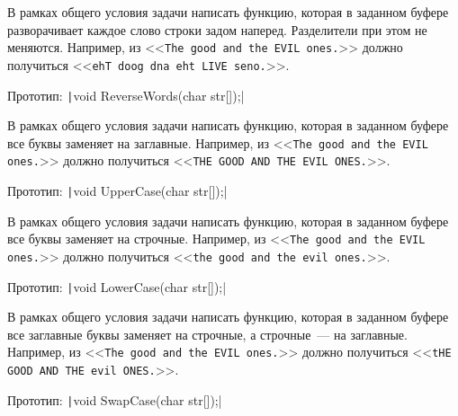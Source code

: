 
\begin{zztask}
В рамках общего условия задачи написать функцию, которая в заданном буфере
разворачивает каждое слово строки задом наперед. Разделители при этом не
меняются.
Например, из
<<\texttt{The good and the EVIL ones.}>>
должно получиться
<<\texttt{ehT doog dna eht LIVE seno.}>>.

Прототип: \texttt|void ReverseWords(char str[]);|
\end{zztask}


\begin{zztask}
В рамках общего условия задачи написать функцию, которая в заданном буфере
все буквы заменяет на заглавные.
Например, из
<<\texttt{The good and the EVIL ones.}>>
должно получиться
<<\texttt{THE GOOD AND THE EVIL ONES.}>>.

Прототип: \texttt|void UpperCase(char str[]);|
\end{zztask}


\begin{zztask}
В рамках общего условия задачи написать функцию, которая в заданном буфере
все буквы заменяет на строчные.
Например, из
<<\texttt{The good and the EVIL ones.}>>
должно получиться
<<\texttt{the good and the evil ones.}>>.

Прототип: \texttt|void LowerCase(char str[]);|
\end{zztask}


\begin{zztask}
В рамках общего условия задачи написать функцию, которая в заданном буфере
все заглавные буквы заменяет на строчные, а строчные~--- на заглавные.
Например, из
<<\texttt{The good and the EVIL ones.}>>
должно получиться
<<\texttt{tHE GOOD AND THE evil ONES.}>>.

Прототип: \texttt|void SwapCase(char str[]);|
\end{zztask}


